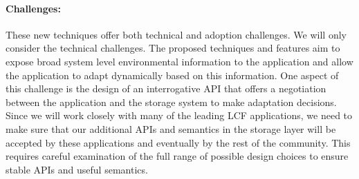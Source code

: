 %

\paragraph{Challenges:}
These new techniques offer both technical and adoption challenges. We will only
consider the technical challenges. The proposed techniques and features aim to
expose broad system level environmental information to the application and
allow the application to adapt dynamically based on this information.  One
aspect of this challenge is the design of an interrogative API that offers a
negotiation between the application and the storage system to make adaptation
decisions.  Since we will work closely with many of the leading LCF
applications, we need to make sure that our additional APIs and semantics in
the storage layer will be accepted by these applications and eventually by the
rest of the community. This requires careful examination of the full range
of possible
design choices to ensure stable APIs and useful semantics.



